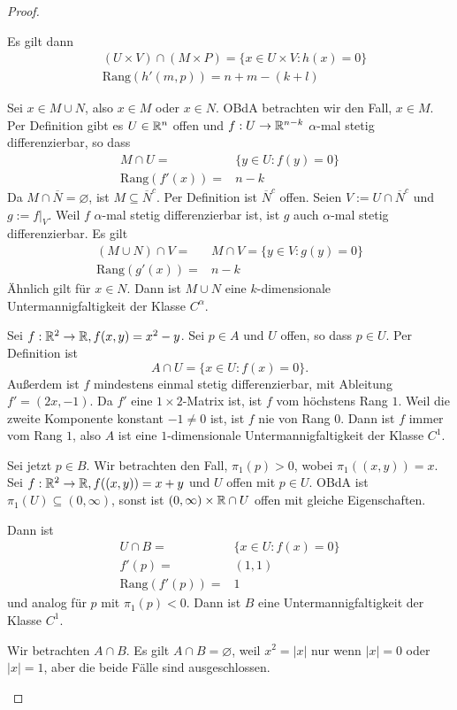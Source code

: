 \begin{proof}
\begin{parts}
Es gilt dann
\begin{align*}
	&(U\times V)\cap (M\times P)=\{x\in U\times V:h(x)=0\} \\
	&\text{Rang}(h'(m,p))=n+m-(k+l)
\end{align*}
\item Sei $x\in M\cup N$, also $x\in M$ oder $x\in N$. OBdA betrachten wir den Fall, $x\in M$. Per Definition gibt es $U\in \mathbb{R}^n$ offen und $f:U\to \mathbb{R}^{n-k}$ $\alpha$-mal stetig differenzierbar, so dass
	\begin{align*}
		M\cap U=&\{y\in U:f(y)=0\} \\
		\text{Rang}(f'(x))=&n-k
	\end{align*}
	Da $M\cap \overline{N}=\varnothing$, ist $M\subseteq \overline{N}^c$. Per Definition ist $\overline{N}^c$ offen. Seien $V:=U\cap \overline{N}^c$ und $g:=f|_V$. Weil $f$ $\alpha$-mal stetig differenzierbar ist, ist $g$ auch $\alpha$-mal stetig differenzierbar. Es gilt
	\begin{align*}
		(M\cup N)\cap V=&M\cap V=\{y\in V:g(y)=0\} \\
		\text{Rang}(g'(x))=&n-k
	\end{align*}
	Ähnlich gilt f\"{u}r $x\in N$. Dann ist $M\cup N$ eine $k$-dimensionale Untermannigfaltigkeit der Klasse $C^\alpha$.
\item Sei $f:\mathbb{R}^2\to \mathbb{R}, f(x,y)=x^2-y$. Sei $p\in A$ und $U$ offen, so dass $p\in U$. Per Definition ist
	\[
	A\cap U=\{x\in U: f(x)=0\} 
	.\] 
	Außerdem ist $f$ mindestens einmal stetig differenzierbar, mit Ableitung $f'=(2x,-1)$. Da $f'$ eine $1\times 2$-Matrix ist, ist $f$ vom höchstens Rang $1$. Weil die zweite Komponente konstant $-1\neq 0$ ist, ist $f$ nie von Rang $0$. Dann ist $f$ immer vom Rang $1$, also $A$ ist eine $1$-dimensionale Untermannigfaltigkeit der Klasse $C^1$.

	Sei jetzt $p\in B$. Wir betrachten den Fall, $\pi_1(p)>0$, wobei $\pi_1((x,y))=x$. Sei $f:\mathbb{R}^2\to \mathbb{R}, f((x,y))=x+y$ und $U$ offen mit $p\in U$. OBdA ist $\pi_1(U)\subseteq (0,\infty)$, sonst ist $(0,\infty)\times \mathbb{R} \cap U$ offen mit gleiche Eigenschaften.

	Dann ist
	\begin{align*}
		U\cap B=&\{x\in U:f(x)=0\} \\
		f'(p)=&(1,1)\\
		\text{Rang}(f'(p))=&1
	\end{align*}
	und analog f\"{u}r $p$ mit $\pi_1(p)<0$. Dann ist $B$ eine Untermannigfaltigkeit der Klasse $C^1$.
\item Wir betrachten $A\cap B$. Es gilt $A\cap B=\varnothing$, weil $x^2=|x|$ nur wenn $|x|=0$ oder $|x|=1$, aber die beide Fälle sind ausgeschlossen.
	\end{parts}
\end{proof}
